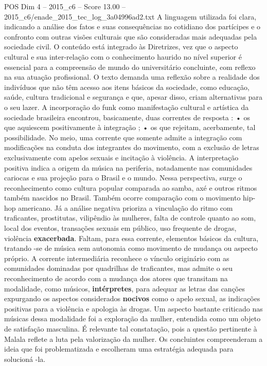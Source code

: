 \begin{textsample}{POS Dim 4 – 2015\_c6 – Score 13.00 – 2015\_c6/enade\_2015\_tec\_log\_3a04996ad2.txt}
A linguagem utilizada foi clara, indicando a análise dos fatos e suas consequências no cotidiano dos partícipes e o confronto com outras visões culturais que são consideradas mais adequadas pela sociedade civil.
O conteúdo está integrado às Diretrizes, vez que o aspecto cultural e sua inter-relação com o conhecimento haurido no nível superior é essencial para a compreensão de mundo do universitário concluinte, com reflexo na sua atuação profissional.
O texto demanda uma reflexão sobre a realidade dos indivíduos que não têm acesso aos itens básicos da sociedade, como educação, saúde, cultura tradicional e segurança e que, apesar disso, criam alternativas para o seu lazer.
A incorporação do funk como manifestação cultural e artística da sociedade brasileira encontrou, basicamente, duas correntes de resposta : • os que aquiescem positivamente à integração ; • os que rejeitam, acerbamente, tal possibilidade.
No meio, uma corrente que somente admite a integração com modificações na conduta dos integrantes do movimento, com a exclusão de letras exclusivamente com apelos sexuais e incitação à violência.
A interpretação positiva indica a origem da música na periferia, notadamente nas comunidades cariocas e sua projeção para o Brasil e o mundo.
Nessa perspectiva, surge o reconhecimento como cultura popular comparada ao samba, axé e outros ritmos também nascidos no Brasil.
Também ocorre comparação com o movimento hip-hop americano.
Já a análise negativa prioriza a vinculação do ritmo com traficantes, prostitutas, vilipêndio às mulheres, falta de controle quanto ao som, local dos eventos, transações sexuais em público, uso frequente de drogas, violência \textbf{exacerbada}.
Faltam, para essa corrente, elementos básicos da cultura, tratando -se de música sem autonomia como movimento de mudança ou aspecto próprio.
A corrente intermediária reconhece o vínculo originário com as comunidades dominadas por quadrilhas de traficantes, mas admite o seu reconhecimento de acordo com a mudança dos atores que transitam na modalidade, como músicos, \textbf{intérpretes}, para adequar as letras das canções expurgando os aspectos considerados \textbf{nocivos} como o apelo sexual, as indicações positivas para a violência e apologia às drogas.
Um aspecto bastante criticado nas músicas dessa modalidade foi a exploração da mulher, entendida como um objeto de satisfação masculina.
É relevante tal constatação, pois a questão pertinente à Malala reflete a luta pela valorização da mulher.
Os concluintes compreenderam a ideia que foi problematizada e escolheram uma estratégia adequada para solucioná -la.

\end{textsample}
